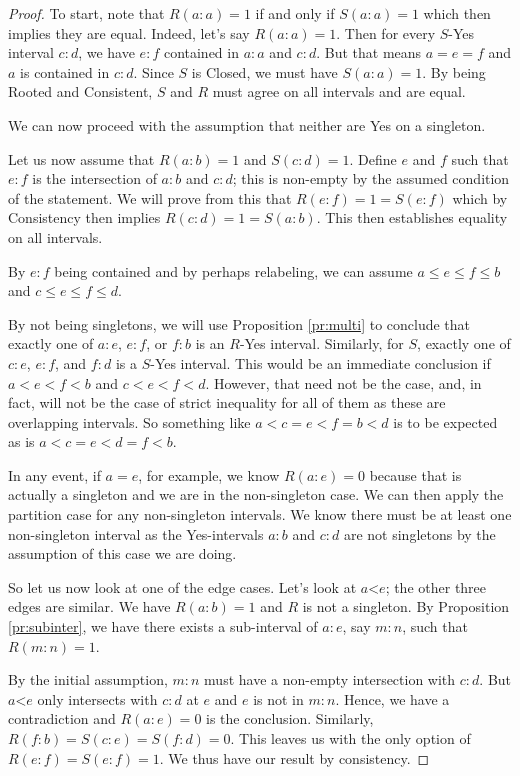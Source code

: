 \documentclass[12pt]{article}
\theoremstyle{remark}
\newcommand{\lt}{\mathord{<}}
\begin{document}
\begin{proof}
To start, note that $R(a:a) = 1$ if and only if $S(a:a) = 1$ which then implies they are equal. Indeed, let's say $R(a:a) =1$. Then for every $S$-Yes interval $c:d$, we have $e:f$ contained in $a:a$ and $c:d$. But that means $a=e=f$ and $a$ is contained in $c:d$. Since $S$ is Closed, we must have $S(a:a)=1$. By being Rooted and Consistent, $S$ and $R$ must agree on all intervals and are equal. 

We can now proceed with the assumption that neither are Yes on a singleton.

Let us now assume that $R(a:b) = 1$ and $S(c:d) = 1$. Define $e$ and $f$ such that $e:f$ is the intersection of $a:b$ and $c:d$; this is non-empty by the assumed condition of the statement. We will prove from this that $R(e:f)=1 = S(e:f)$ which by Consistency then implies $R(c:d) = 1 = S(a:b)$. This then establishes equality on all intervals. 

By $e:f$ being contained and by perhaps relabeling, we can assume $a \leq e \leq f \leq b$ and $c \leq e \leq f \leq d$. 

By not being singletons, we will use Proposition \ref{pr:multi} to conclude that exactly one of $a:e$, $e:f$, or $f:b$ is an $R$-Yes interval. Similarly, for $S$, exactly one of $c:e$, $e:f$, and $f:d$ is a $S$-Yes interval. This would be an immediate conclusion if $a < e < f < b$ and $c < e < f < d$. However, that need not be the case, and, in fact, will not be the case of strict inequality for all of them as these are overlapping intervals. So something like $a < c = e < f = b < d$ is to be expected as is $a < c = e < d = f < b$. 

In any event, if $a=e$, for example, we know $R(a:e) = 0$ because that is actually a singleton and we are in the non-singleton case. We can then apply the partition case for any non-singleton intervals. We know there must be at least one non-singleton interval as the Yes-intervals $a:b$ and $c:d$ are not singletons by the assumption of this case we are doing. 

So let us now look at one of the edge cases. Let's look at $a\lt e$; the other three edges are similar. We have $R(a:b) =1$ and $R$ is not a singleton. By Proposition \ref{pr:subinter}, we have there exists a sub-interval of $a:e$, say $m:n$, such that $R(m:n) = 1$. 

By the initial assumption, $m:n$ must have a non-empty intersection with $c:d$. But $a\lt e$ only intersects with $c:d$ at $e$ and $e$ is not in $m:n$. Hence, we have a contradiction and $R(a:e)=0$ is the conclusion. Similarly, $R(f:b) = S(c:e) = S(f:d) = 0$. This leaves us with the only option of $R(e:f) = S(e:f) = 1$. We thus have our result by consistency.  

\end{proof}
\end{document}
